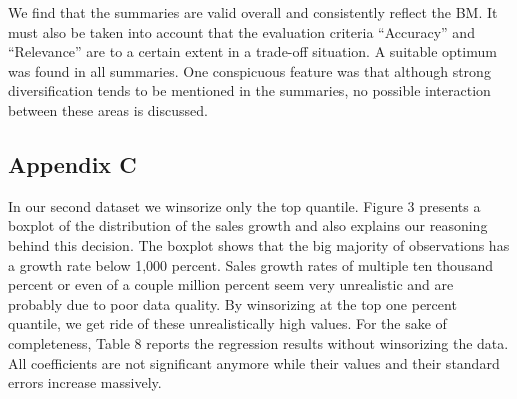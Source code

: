 \documentclass[
]{article}
\begin{document}
\begin{table}[H]
\centering
\caption{Subjective Evaluation of Random Item 1 Summaries}
\centering
{}
\end{table}

We find that the summaries are valid overall and consistently reflect
the BM. It must also be taken into account that the evaluation criteria
``Accuracy'' and ``Relevance'' are to a certain extent in a trade-off
situation. A suitable optimum was found in all summaries. One
conspicuous feature was that although strong diversification tends to be
mentioned in the summaries, no possible interaction between these areas
is discussed.

\subsection{Appendix C}\label{appendix-c}

In our second dataset we winsorize only the top quantile. Figure 3
presents a boxplot of the distribution of the sales growth and also
explains our reasoning behind this decision. The boxplot shows that the
big majority of observations has a growth rate below 1,000 percent.
Sales growth rates of multiple ten thousand percent or even of a couple
million percent seem very unrealistic and are probably due to poor data
quality. By winsorizing at the top one percent quantile, we get ride of
these unrealistically high values. For the sake of completeness, Table 8
reports the regression results without winsorizing the data. All
coefficients are not significant anymore while their values and their
standard errors increase massively.
\end{document}
